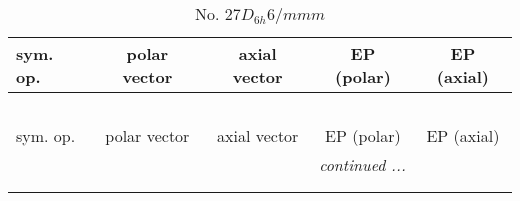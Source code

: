 \documentclass[fleqn,10pt,landscape]{jsarticle}
\begin{document}
\newpage
\begin{center}
\renewcommand{\arraystretch}{1.3}
\begin{longtable}{lcccc}
\caption{No. 27\quad$D_{6h}$\quad$6/mmm$\quad[ hexagonal ]}
 \\
 \hline \hline
sym. op. & polar vector & axial vector & EP (polar) & EP (axial) \\ \hline \endfirsthead

\multicolumn{4}{l}{\tablename\ \thetable{}} \\
 \hline \hline
sym. op. & polar vector & axial vector & EP (polar) & EP (axial) \\ \hline \endhead

 \hline \hline
\multicolumn{4}{r}{\footnotesize\it continued ...} \\ \endfoot

 \hline \hline
\multicolumn{4}{r}{} \\ \endlastfoot


\end{longtable}
\end{center}
\end{document}
